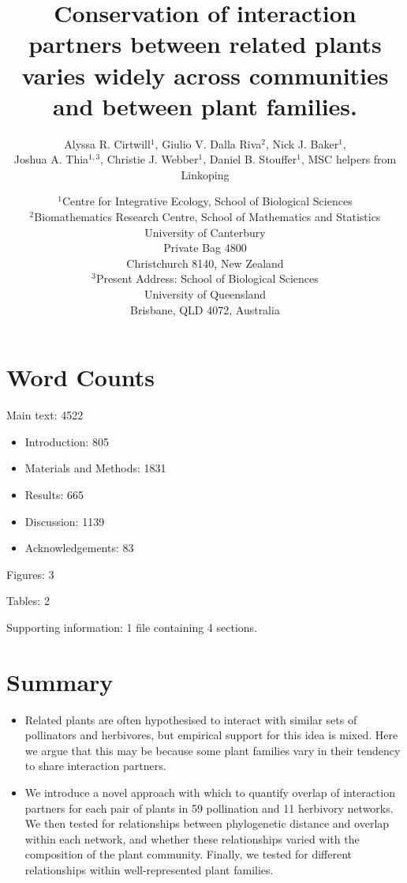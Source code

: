 \documentclass[12pt]{article}
\title{Conservation of interaction partners between related plants varies widely across communities and between plant families.}
\author{Alyssa R. Cirtwill$^{1}$, Giulio V. Dalla Riva$^{2}$, Nick J. Baker$^{1}$,\\
 Joshua A. Thia$^{1,3}$, Christie J. Webber$^{1}$, Daniel B. Stouffer$^{1}$, MSC helpers from Linkoping}
\date{\small$^1$Centre for Integrative Ecology, School of Biological Sciences\\
    \medskip$^2$Biomathematics Research Centre, School of Mathematics and Statistics\\
            University of Canterbury\\Private Bag 4800\\
Christchurch 8140, New Zealand\\
\medskip$^3$Present Address: School of Biological Sciences\\
University of Queensland\\Brisbane, QLD 4072, Australia }
\begin{document}
\maketitle
\baselineskip=8.5mm
\begin{spacing}{1.0}

\section*{Word Counts}

Main text: 4522

\begin{itemize}
  \item Introduction: 805 
  \item Materials and Methods: 1831 
  \item Results: 665
  \item Discussion: 1139 
  \item Acknowledgements: 83
\end{itemize}



Figures: 3


Tables: 2


Supporting information: 1 file containing 4 sections.


\vspace{0.4 in}

\section*{Summary}

  \begin{itemize}
    \item Related plants are often hypothesised to interact with similar sets of 
          pollinators and herbivores, but empirical support for this idea is mixed.
          Here we argue that this may be because some plant families vary in their 
          tendency to share interaction partners.

    \item We introduce a novel approach with which to quantify
          overlap of interaction
          partners for each pair of plants in 59 pollination and 11 herbivory
          networks.  We then tested for relationships between phylogenetic 
          distance and overlap within each network, and whether these 
          relationships varied with the composition of the plant community.
          Finally, we tested for different relationships within well-represented
          plant families.


\end{itemize}
\end{spacing}
\end{document}
